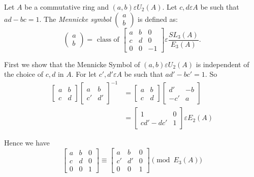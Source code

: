 \begin{dfn}\label{c2:dfn3.4}
Let $A$ be a commutative ring and $(a,b)\varepsilon U_2(A)$. Let
$c,d\varepsilon A$ be such that $ad-bc=1$. The \textit{Mennicke
  symbol} $\begin{pmatrix}
a\\
b
\end{pmatrix}$ is defined as: 
$$
\begin{pmatrix}
a\\
b
\end{pmatrix} = \text{ class of } \begin{bmatrix}
a & b & 0\\
c & d & 0\\
0 & 0 & -1
\end{bmatrix} \varepsilon \frac{SL_3(A)}{E_3(A)}.
$$

First we show that the Mennicke Symbol of $(a, b) \varepsilon U_2(A)$
is independent of the choice of $c,d$ in $A$. For let
$c',d'\varepsilon A$ be such that $ad'-bc'=1$. So
$$
\begin{aligned}
\begin{bmatrix}
a & b\\
c & d
\end{bmatrix} \begin{bmatrix}
a & b\\
c' & d'
\end{bmatrix}^{-1} &= \begin{bmatrix}
a & b\\
c & d
\end{bmatrix} \begin{bmatrix}
d' & -b\\
-c'&  a
\end{bmatrix}\\ &= \begin{bmatrix}
1 & 0\\
cd'-dc' & 1
\end{bmatrix} \varepsilon E_2(A)
\end{aligned}
$$

Hence we have
$$
\begin{bmatrix}
a & b & 0\\
c & d & 0\\
0 & 0 & 1
\end{bmatrix} \equiv \begin{bmatrix}
a & b & 0\\
c' & d' & 0\\
0 & 0 & 1
\end{bmatrix} \pmod{E_3(A)}
$$
\end{dfn}

